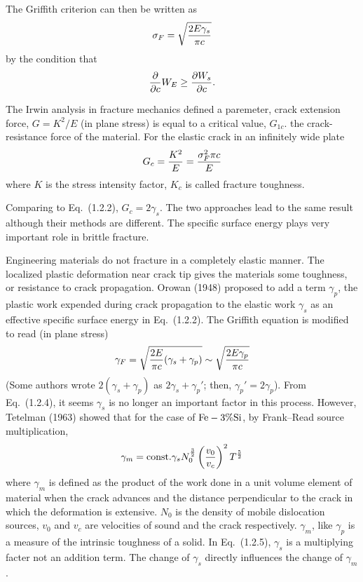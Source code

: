 The Griffith criterion can then be written as
\begin{equation}
{\sigma_F} = {\sqrt {{2E \gamma_s} \over {\pi c}}}
\end{equation}
by the condition that
$${\partial \over {\partial c}} {W_E} \geq {{\partial W_s} \over 
{\partial c}}. $$

The Irwin analysis in fracture mechanics defined a paremeter, crack 
extension force, $G = {K^2} / E$ (in plane stress) is equal to a 
critical value, $G_{1c}$. the crack-resistance force of the material. 
For the elastic crack in an infinitely wide plate
\begin{equation}
{G_c} = {{K^2} \over E} = {{\sigma_F^2 \pi c} \over E}
\end{equation}
where $K$ is the stress intensity factor, $K_c$ is called fracture 
toughness. 

Comparing to Eq.~(1.2.2), $G_c = 2 \gamma_s$. The two approaches 
lead to the same result although their methods are different. The 
specific surface energy plays very important role in brittle fracture.

Engineering materials do not fracture in a completely elastic 
manner. The localized plastic deformation near crack tip gives the 
materials some toughness, or resistance to crack propagation. Orowan 
(1948) proposed to add a term $\gamma_p$, the plastic work expended 
during crack propagation to the elastic work $\gamma_s$ as an 
effective specific surface energy in Eq.~(1.2.2). The Griffith 
equation is modified to read (in plane stress)
\begin{equation}
\gamma_F = \sqrt {{{2E} \over {\pi c}} (\gamma_s + \gamma_p)} \sim 
\sqrt {{{2E \gamma_p} \over {\pi c}}}
\end{equation}
(Some authors wrote $2(\gamma_s + \gamma_p)$ as $2 \gamma_s + 
\gamma_p'$; then, $\gamma_p' = 2 \gamma_p$). From Eq.~(1.2.4), it 
seems $\gamma_s$ is no longer an important factor in this process. 
However, Tetelman (1963) showed that for the case of $\rm Fe-3\% Si$, by 
Frank--Read source multiplication,
\begin{equation}
\gamma_m = {\rm const.} \gamma_s N_0^{3\over2} 
\left({{v_0} \over {v_c}}\right)^2 T^{5 \over 2}
\end{equation}
where $\gamma_m$ is defined as the product of the work done in a unit 
volume element of material when the crack advances and the distance 
perpendicular to the crack in which the deformation is extensive. 
$N_0$ is the density of mobile dislocation sources, $v_0$ and $v_c$ 
are velocities of sound and the crack respectively. $\gamma_m$, like 
$\gamma_p$ is a measure of the intrinsic toughness of a solid. In 
Eq.~(1.2.5), $\gamma_s$ is a multiplying facter not an addition term. 
The change of $\gamma_s$ directly influences the change of $\gamma_m$.

